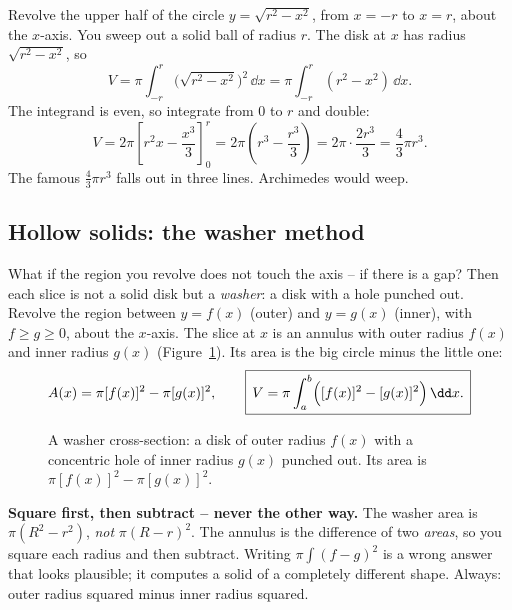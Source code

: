 \begin{example}
\label{ch26:ex-sphere}
Revolve the upper half of the circle $y = \sqrt{r^2 - x^2}$, from $x=-r$ to
$x=r$, about the $x$-axis. You sweep out a solid ball of radius $r$. The disk at
$x$ has radius $\sqrt{r^2-x^2}$, so
\[
  V = \pi\int_{-r}^{r}\bigl(\sqrt{r^2-x^2}\bigr)^2\,\dd x
    = \pi\int_{-r}^{r}(r^2 - x^2)\,\dd x.
\]
The integrand is even, so integrate from $0$ to $r$ and double:
\[
  V = 2\pi\left[r^2 x - \frac{x^3}{3}\right]_0^{r}
    = 2\pi\left(r^3 - \frac{r^3}{3}\right)
    = 2\pi\cdot\frac{2r^3}{3} = \frac{4}{3}\pi r^3.
\]
The famous $\tfrac43\pi r^3$ falls out in three lines. Archimedes would weep.
\end{example}

\subsection{Hollow solids: the washer method}

What if the region you revolve does not touch the axis -- if there is a gap? Then
each slice is not a solid disk but a \emph{washer}: a disk with a hole punched out.
Revolve the region between $y=f(x)$ (outer) and $y=g(x)$ (inner), with
$f \ge g \ge 0$, about the $x$-axis. The slice at $x$ is an annulus with outer
radius $f(x)$ and inner radius $g(x)$ (Figure~\ref{ch26:fig-washer}). Its area is
the big circle minus the little one:
\[
  A(x) = \pi[f(x)]^2 - \pi[g(x)]^2,\qquad
  \boxed{\,V = \pi\int_a^b\Bigl([f(x)]^2 - [g(x)]^2\Bigr)\,\dd x.\,}
\]

\begin{figure}[H]
\centering
{}
\caption{A washer cross-section: a disk of outer radius $f(x)$ with a concentric
hole of inner radius $g(x)$ punched out. Its area is $\pi[f(x)]^2 - \pi[g(x)]^2$.}
\label{ch26:fig-washer}
\end{figure}

\begin{trapbox}
\textbf{Square first, then subtract -- never the other way.} The washer area is
$\pi(R^2 - r^2)$, \emph{not} $\pi(R-r)^2$. The annulus is the difference of two
\emph{areas}, so you square each radius and then subtract. Writing
$\pi\int (f-g)^2$ is a wrong answer that looks plausible; it computes a solid of a
completely different shape. Always: outer radius squared minus inner radius
squared.
\end{trapbox}

